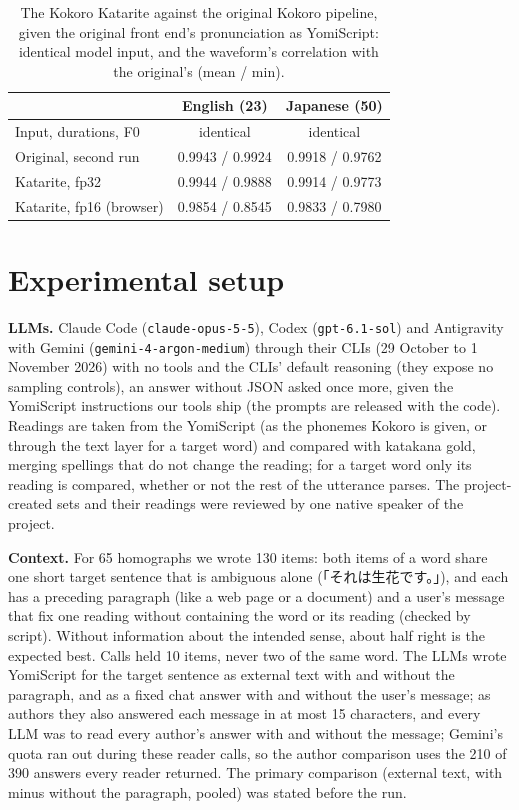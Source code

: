 \documentclass{Interspeech}
\begin{document}
\begin{table}[t]
\centering\footnotesize
\caption{The Kokoro Katarite against the original Kokoro pipeline, given the original front end's pronunciation as
YomiScript: identical model input, and the waveform's correlation with the original's (mean / min).}
\label{tab:parity}
\setlength{\tabcolsep}{3pt}
\begin{tabular}{lcc}
\toprule
& English (23) & Japanese (50)\\
\midrule
Input, durations, F0 & identical & identical\\
Original, second run & 0.9943 / 0.9924 & 0.9918 / 0.9762\\
Katarite, fp32 & 0.9944 / 0.9888 & 0.9914 / 0.9773\\
Katarite, fp16 (browser) & 0.9854 / 0.8545 & 0.9833 / 0.7980\\
\bottomrule
\end{tabular}
\end{table}

\section{Experimental setup}

\textbf{LLMs.} Claude Code (\texttt{claude-opus-5-5}), Codex (\texttt{gpt-6.1-sol}) and Antigravity with
Gemini (\texttt{gemini-4-argon-medium}) through their CLIs (29 October to 1 November 2026) with no tools and the CLIs' default reasoning (they expose no
sampling controls), an answer without JSON asked once more, given the YomiScript instructions our tools ship (the
prompts are released with the code).
Readings are taken from the YomiScript (as the phonemes Kokoro is given, or through the text layer for a target word)
and compared with katakana gold, merging spellings that do not change the reading; for a target word only its
reading is compared, whether or not the rest of the utterance parses. The project-created sets and their readings
were reviewed by one native speaker of the project.

\textbf{Context.} For 65 homographs we wrote 130 items: both items of a word share one short target sentence that is
ambiguous alone (「それは生花です。」), and each has a preceding paragraph (like a web page or a document) and a user's
message that fix one reading without containing the word or its reading (checked by script). Without information about the intended sense, about half right is the
expected best. Calls held 10 items, never two of the same word. The LLMs wrote YomiScript for the target sentence as external text with and
without the paragraph, and as a fixed chat answer with and without the user's message; as authors they also answered
each message in at most 15 characters, and every LLM was to read every author's answer with and without the message;
Gemini's quota ran out during these reader calls, so the author comparison uses the 210 of 390 answers every reader
returned. The
primary comparison (external text, with minus without the paragraph, pooled) was stated before the run.
\end{document}
